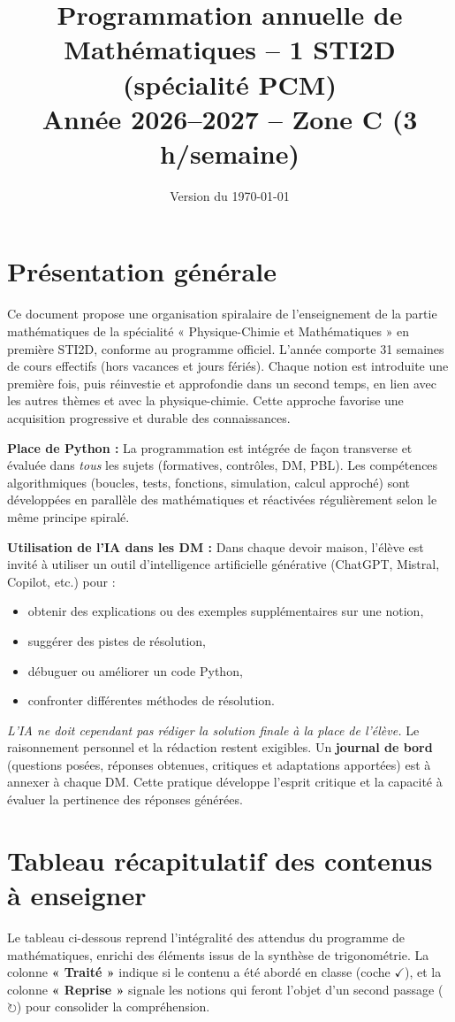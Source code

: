 \documentclass[a4paper,12pt]{article}
\title{Programmation annuelle de Mathématiques -- 1\up{re} STI2D (spécialité PCM) \\
	Année 2026--2027 -- Zone C (3 h/semaine)}
\author{}
\date{Version du \today}
\newcommand{\fait}{\ensuremath{\checkmark}}
\newcommand{\revoit}{\ensuremath{\circlearrowright}}
\begin{document}
	
	\maketitle
	
	\section*{Présentation générale}
	Ce document propose une organisation spiralaire de l’enseignement de la partie mathématiques de la spécialité « Physique-Chimie et Mathématiques » en première STI2D, conforme au programme officiel. L’année comporte 31 semaines de cours effectifs (hors vacances et jours fériés). Chaque notion est introduite une première fois, puis réinvestie et approfondie dans un second temps, en lien avec les autres thèmes et avec la physique-chimie. Cette approche favorise une acquisition progressive et durable des connaissances.
	
	\medskip
	\textbf{Place de Python :} La programmation est intégrée de façon transverse et évaluée dans \emph{tous} les sujets (formatives, contrôles, DM, PBL). Les compétences algorithmiques (boucles, tests, fonctions, simulation, calcul approché) sont développées en parallèle des mathématiques et réactivées régulièrement selon le même principe spiralé.
	
	\medskip
	\textbf{Utilisation de l’IA dans les DM :} Dans chaque devoir maison, l’élève est invité à utiliser un outil d’intelligence artificielle générative (ChatGPT, Mistral, Copilot, etc.) pour :
	\begin{itemize}
		\item obtenir des explications ou des exemples supplémentaires sur une notion,
		\item suggérer des pistes de résolution,
		\item débuguer ou améliorer un code Python,
		\item confronter différentes méthodes de résolution.
	\end{itemize}
	\emph{L’IA ne doit cependant pas rédiger la solution finale à la place de l’élève.} Le raisonnement personnel et la rédaction restent exigibles. Un \textbf{journal de bord} (questions posées, réponses obtenues, critiques et adaptations apportées) est à annexer à chaque DM. Cette pratique développe l’esprit critique et la capacité à évaluer la pertinence des réponses générées.
	
	\section{Tableau récapitulatif des contenus à enseigner}
	Le tableau ci-dessous reprend l’intégralité des attendus du programme de mathématiques, enrichi des éléments issus de la synthèse de trigonométrie. La colonne \textbf{« Traité »} indique si le contenu a été abordé en classe (coche \fait), et la colonne \textbf{« Reprise »} signale les notions qui feront l’objet d’un second passage (\revoit) pour consolider la compréhension.
	
\end{document}

